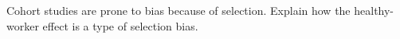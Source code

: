 
Cohort studies are prone to bias because of selection.  Explain how
the healthy-worker effect is a type of selection bias.

\TextEntry
